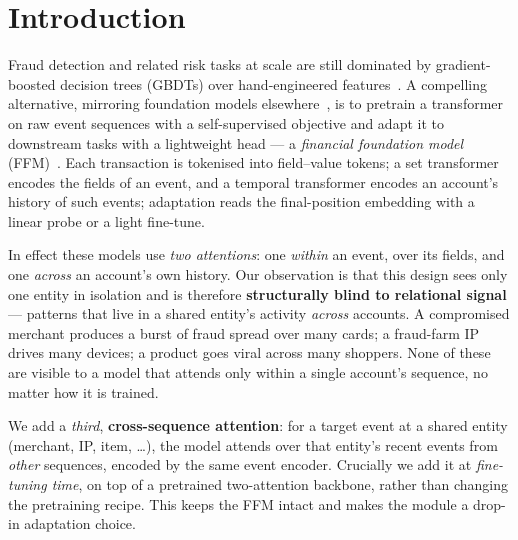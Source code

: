 \section{Introduction}

Fraud detection and related risk tasks at scale are still dominated by gradient-boosted decision
trees (GBDTs) over hand-engineered features~\cite{ke2017lightgbm,chen2016xgboost}. A compelling
alternative, mirroring foundation models elsewhere~\cite{bommasani2021foundation}, is to pretrain a
transformer on raw event sequences with a self-supervised objective and adapt it to downstream tasks
with a lightweight head --- a \emph{financial foundation model}
(FFM)~\cite{ostroukhov2026pragma,yeh2025treasure,padhi2021tabular}. Each transaction is tokenised
into field--value tokens; a set transformer encodes the fields of an event, and a temporal
transformer encodes an account's history of such events; adaptation reads the final-position
embedding with a linear probe or a light fine-tune.

In effect these models use \emph{two attentions}: one \emph{within} an event, over its fields, and
one \emph{across} an account's own history. Our observation is that this design sees only one entity
in isolation and is therefore \textbf{structurally blind to relational signal} --- patterns that
live in a shared entity's activity \emph{across} accounts. A compromised merchant produces a burst
of fraud spread over many cards; a fraud-farm IP drives many devices; a product goes viral across
many shoppers. None of these are visible to a model that attends only within a single account's
sequence, no matter how it is trained.

We add a \emph{third}, \textbf{cross-sequence attention}: for a target event at a shared entity
(merchant, IP, item, \dots), the model attends over that entity's recent events from \emph{other}
sequences, encoded by the same event encoder. Crucially we add it at \emph{fine-tuning time}, on top
of a pretrained two-attention backbone, rather than changing the pretraining recipe. This keeps the
FFM intact and makes the module a drop-in adaptation choice.

